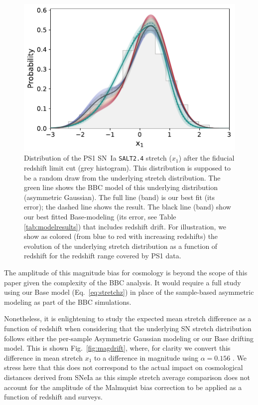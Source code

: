 \documentclass[]{aa} %
\newcommand{\mr}[1]{{\textcolor[rgb]{0.60,0.10,0.6}{#1}}}
\begin{document}
\begin{figure}
    \centering
    \includegraphics[width=\linewidth]{Article_figures/bbc_comp_PS1_hist-nr.pdf}
    \caption{Distribution of the PS1 SN~Ia \textsc{\texttt{SALT2.4}} stretch
        ($x_1$) after the fiducial redshift limit cut (grey histogram). This
        distribution is supposed to be a random draw from the underlying stretch
        distribution. The green line shows the BBC model of this underlying
        distribution (asymmetric Gaussian). The full line (band) is our best fit
        (its error); the dashed line shows the \cite{scolnic2018a} result. The
        black line (band) show our best fitted Base-modeling (its error, see
        Table \ref{tab:modelresults}) that includes redshift drift. For
    illustration, we show as colored (from blue to red with increasing
redshifts) the evolution of the underlying stretch distribution as a function of
redshift for the redshift range covered by PS1 data.}
    \label{fig:bbc_pdf_ps1}
\end{figure}


The amplitude of this magnitude bias for cosmology is beyond the scope of this paper given the complexity of the BBC analysis. It would require a full
study using our Base model (Eq.~\ref{eq:stretchz}) in place of the sample-based
asymmetric modeling as part of the BBC simulations.

Nonetheless, it is enlightening to study the expected mean stretch difference as
a function of redshift when considering that the underlying SN stretch
distribution follows either the per-sample Asymmetric Gaussian modeling or our Base drifting model. This
is shown Fig.~\ref{fig:magdrift}, where, for clarity we convert this difference
in mean stretch $x_1$ to a difference in magnitude using $\alpha=0.156$
\citep{scolnic2018a}. \mr{We stress here that this does not correspond to the actual impact on cosmological distances derived from SNeIa as this simple stretch average comparison does not account for the amplitude of the Malmquist bias correction to be applied as a function of redshift and surveys.}
\end{document}
